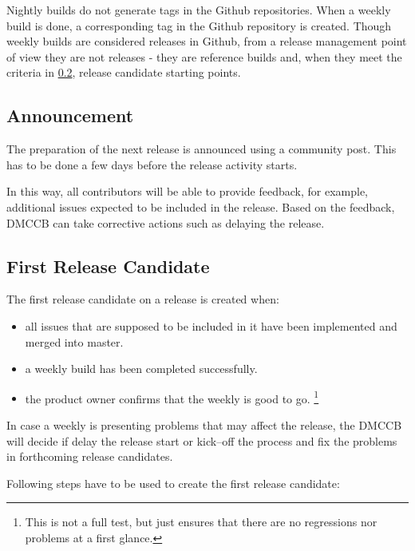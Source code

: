Nightly builds do not generate tags in the Github repositories.
When a weekly build is done, a corresponding tag in the Github repository is created.
Though weekly builds are considered releases in Github, from a release management point of view they are not
releases - they are reference builds and, when they meet the criteria in \ref{sec:firstrc}, release candidate starting points.


\subsection{Announcement} \label{sec:anaouncement}

The preparation of the next release is announced using a community post.
This has to be done a few days before the release activity starts.

In this way, all contributors will be able to provide feedback, for example, additional issues expected to be included in the release.
Based on the feedback, DMCCB can take corrective actions such as delaying the release.


\subsection{First Release Candidate} \label{sec:firstrc}

The first release candidate on a release is created when:

\begin{itemize}
\item all issues that are supposed to be included in it have been implemented and merged into master.
\item a weekly build has been completed successfully.
\item the product owner confirms that the weekly is good to go. \footnote{This is not a full test, but just ensures that there are no regressions nor problems at a first glance.}
\end{itemize}

In case a weekly is presenting problems that may affect the release, the DMCCB will decide if delay the release start or kick--off the process and fix the problems in forthcoming release candidates.


Following steps have to be used to create the first release candidate:

